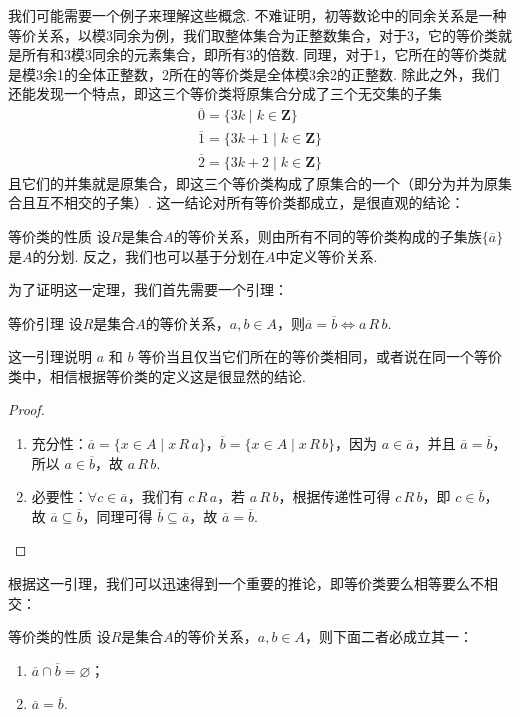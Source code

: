我们可能需要一个例子来理解这些概念. 不难证明，初等数论中的同余关系是一种等价关系，以模3同余为例，我们取整体集合为正整数集合，对于3，它的等价类就是所有和3模3同余的元素集合，即所有3的倍数. 同理，对于1，它所在的等价类就是模3余1的全体正整数，2所在的等价类是全体模3余2的正整数. 除此之外，我们还能发现一个特点，即这三个等价类将原集合分成了三个无交集的子集
\begin{gather*}
    \overline{0}=\{3k\mid k\in\mathbf{Z}\} \\
    \overline{1}=\{3k+1\mid k\in\mathbf{Z}\} \\
    \overline{2}=\{3k+2\mid k\in\mathbf{Z}\}
\end{gather*}
且它们的并集就是原集合，即这三个等价类构成了原集合的一个（即分为并为原集合且互不相交的子集）. 这一结论对所有等价类都成立，是很直观的结论：
\begin{theorem}{}{等价类的性质}
    设$R$是集合$A$的等价关系，则由所有不同的等价类构成的子集族$\{\overline{a}\}$是$A$的分划. 反之，我们也可以基于分划在$A$中定义等价关系.
\end{theorem}

为了证明这一定理，我们首先需要一个引理：
\begin{lemma}{}{等价引理}
    设$R$是集合$A$的等价关系，$a,b\in A$，则$\overline{a}=\overline{b}\iff a\,R\,b$.
\end{lemma}
这一引理说明 $a$ 和 $b$ 等价当且仅当它们所在的等价类相同，或者说在同一个等价类中，相信根据等价类的定义这是很显然的结论.

\begin{proof}
\begin{enumerate}
    \item 充分性：$\overline{a}=\{ x \in A \mid x \,R\, a \}$，$\overline{b}=\{ x \in A \mid x \,R\, b \}$，因为 $a \in \overline{a}$，并且 $\overline{a} = \overline{b}$，所以 $a \in \overline{b}$，故 $a \,R\, b$.
    \item 必要性：$\forall c \in \overline{a}$，我们有 $c \,R\, a$，若 $a \,R\, b$，根据传递性可得 $c \,R\, b$，即 $c \in \overline{b}$，故 $\overline{a} \subseteq \overline{b}$，同理可得 $\overline{b} \subseteq \overline{a}$，故 $\overline{a} = \overline{b}$.
\end{enumerate}
\end{proof}

根据这一引理，我们可以迅速得到一个重要的推论，即等价类要么相等要么不相交：
\begin{corollary}{}{等价类的性质}
    设$R$是集合$A$的等价关系，$a,b\in A$，则下面二者必成立其一：
    \begin{enumerate}
        \item $\overline{a}\cap\overline{b}=\varnothing$；

        \item $\overline{a}=\overline{b}$.
    \end{enumerate}
\end{corollary}

